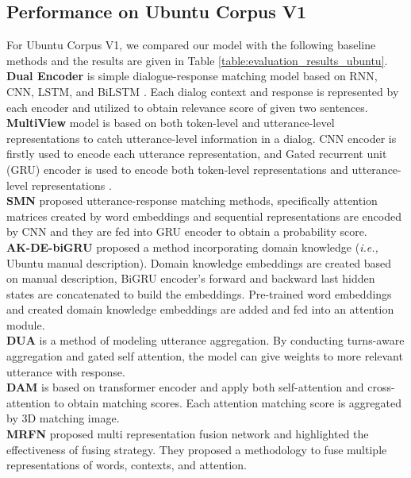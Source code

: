 \documentclass[a4paper]{article}
\begin{document}
\subsection{Performance on Ubuntu Corpus V1}
For Ubuntu Corpus V1, we compared our model with the following baseline methods and the results are given in Table \ref{table:evaluation_results_ubuntu}.  \\
\textbf{Dual Encoder} is simple dialogue-response matching model based on RNN, CNN, LSTM, and BiLSTM \cite{kadlec2015improved}. Each dialog context and response is represented by each encoder and utilized to obtain relevance score of given two sentences. \\
\textbf{MultiView} model is based on both token-level and utterance-level representations to catch utterance-level information in a dialog. CNN encoder is firstly used to encode each utterance representation, and Gated recurrent unit (GRU) encoder is used to encode both token-level representations and utterance-level representations \cite{zhou2016multi}. \\
\textbf{SMN} \cite{wu2017sequential} proposed utterance-response matching methods, specifically attention matrices created by word embeddings and sequential representations are encoded by CNN and they are fed into GRU encoder to obtain a probability score.  \\
\textbf{AK-DE-biGRU} \cite{chaudhuri2018improving} proposed a method incorporating domain knowledge ({\em{i.e.,}} Ubuntu manual description). Domain knowledge embeddings are created based on manual description, BiGRU encoder's forward and backward last hidden states are concatenated to build the embeddings. Pre-trained word embeddings and created domain knowledge embeddings are added and fed into an attention module.\\
\textbf{DUA} \cite{zhang2018dua} is a method of modeling utterance aggregation. By conducting turns-aware aggregation and gated self attention, the model can give weights to more relevant utterance with response. \\
\textbf{DAM} \cite{zhou2018multi} is based on transformer \cite{vaswani2017attention} encoder and apply both self-attention and cross-attention to obtain matching scores. Each attention matching score is aggregated by 3D matching image.\\
\textbf{MRFN} \cite{tao2019multi} proposed multi representation fusion network and highlighted the effectiveness of fusing strategy. They proposed a methodology to fuse multiple representations of words, contexts, and attention. \\
\end{document}
